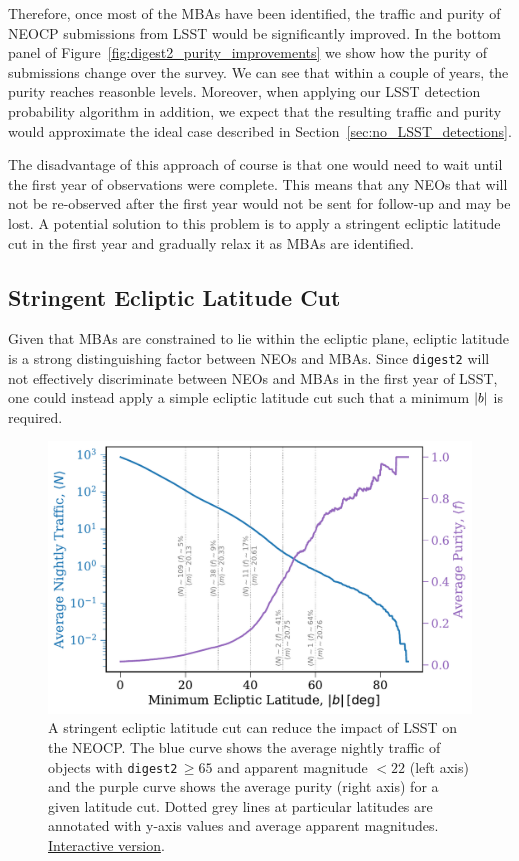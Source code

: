 \documentclass[twocolumn]{aastex631}
\newcommand{\dig}{\texttt{digest2}}
\begin{document}
Therefore, once most of the MBAs have been identified, the traffic and purity of NEOCP submissions from LSST would be significantly improved. In the bottom panel of Figure~\ref{fig:digest2_purity_improvements} we show how the purity of submissions change over the survey. We can see that within a couple of years, the purity reaches reasonble levels. Moreover, when applying our LSST detection probability algorithm in addition, we expect that the resulting traffic and purity would approximate the ideal case described in Section~\ref{sec:no_LSST_detections}.

The disadvantage of this approach of course is that one would need to wait until the first year of observations were complete. This means that any NEOs that will not be re-observed after the first year would not be sent for follow-up and may be lost. A potential solution to this problem is to apply a stringent ecliptic latitude cut in the first year and gradually relax it as MBAs are identified.

\subsection{Stringent Ecliptic Latitude Cut}\label{sec:ecl_lat}
Given that MBAs are constrained to lie within the ecliptic plane, ecliptic latitude is a strong distinguishing factor between NEOs and MBAs. Since \dig{} will not effectively discriminate between NEOs and MBAs in the first year of LSST, one could instead apply a simple ecliptic latitude cut such that a minimum $\abs{b}$ is required.

\begin{figure}[tb]
    \centering
    \includegraphics[width=\columnwidth]{figures/ecliptic_latitude_cutoff.pdf}
    \caption{A stringent ecliptic latitude cut can reduce the impact of LSST on the NEOCP. The blue curve shows the average nightly traffic of objects with \dig{}$\,\ge 65$ and apparent magnitude $< 22$ (left axis) and the purple curve shows the average purity (right axis) for a given latitude cut. Dotted grey lines at particular latitudes are annotated with y-axis values and average apparent magnitudes. \href{https://www.tomwagg.com/html/interact/neocp_ecliptic_latitude.html}{Interactive version}.}
    \label{fig:ecl_lat_cutoff}
\end{figure}
\end{document}
